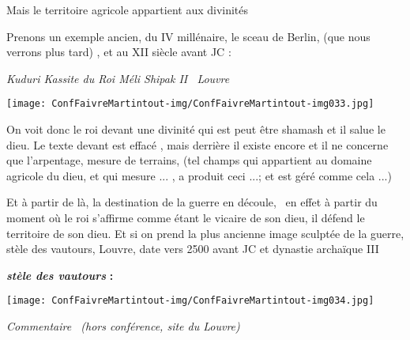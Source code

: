 \documentclass[a4paper]{article}
\begin{document}
{
Mais le territoire agricole appartient aux divinités}


\bigskip

{
Prenons un exemple ancien, du IV millénaire, le sceau de Berlin, (que
nous verrons plus tard) , et au XII siècle avant JC :}


\bigskip

{
\textit{Kuduri Kassite du Roi Méli Shipak II \ Louvre}}


\bigskip


\texttt{[image: ConfFaivreMartintout-img/ConfFaivreMartintout-img033.jpg]}


{
On voit donc le roi devant une divinité qui est peut être shamash et il
salue le dieu. Le texte devant est effacé , mais derrière il existe
encore et il ne concerne que l'arpentage, mesure de terrains, (tel
champs qui appartient au domaine agricole du dieu, et qui mesure ... ,
a produit ceci ...; et est géré comme cela ...)}


\bigskip

{
Et à partir de là, la destination de la guerre en découle, \ en effet à
partir du moment où le roi s'affirme comme étant le vicaire de son
dieu, il défend le territoire de son dieu. Et si on prend la plus
ancienne image sculptée de la guerre, stèle des vautours, Louvre, date
vers 2500 avant JC et dynastie archaïque III}


\bigskip

{
\textbf{\textit{stèle des vautours}}\textbf{ : }}


\bigskip


\texttt{[image: ConfFaivreMartintout-img/ConfFaivreMartintout-img034.jpg]}



\bigskip


\bigskip


\bigskip


\bigskip


\bigskip


\bigskip


\bigskip


\bigskip


\bigskip


\bigskip

{
\textit{Commentaire \ (hors conférence, site du Louvre)}}
\end{document}
